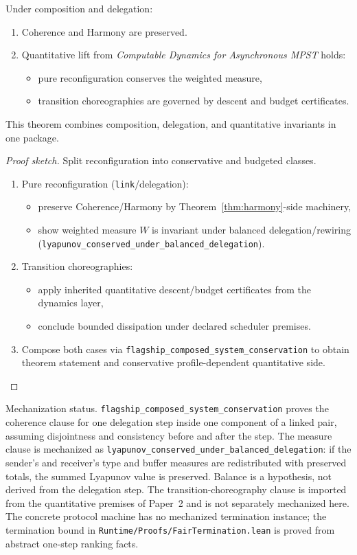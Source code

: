\documentclass[a4paper,10pt,twocolumn,english]{article}
\numberwithin{equation}{section}
\theoremstyle{paperdef}
\theoremstyle{paperplain}
\theoremstyle{paperdef}
\theoremstyle{paperremark}
\theoremstyle{paperdef}
\begin{document}
Under composition and delegation:
\begin{enumerate}
	\item Coherence and Harmony are preserved.
	\item Quantitative lift from \emph{Computable Dynamics for Asynchronous MPST} holds:
	      \begin{itemize}
		      \item pure reconfiguration conserves the weighted measure,
		      \item transition choreographies are governed by descent and budget certificates.
	      \end{itemize}
\end{enumerate}

This theorem combines composition, delegation, and quantitative invariants in one package.

\begin{proof}[Proof sketch]
	Split reconfiguration into conservative and budgeted classes.

	\begin{enumerate}
		\item Pure reconfiguration (\texttt{link}/delegation):
		      \begin{itemize}
			      \item preserve Coherence/Harmony by Theorem~\ref{thm:harmony}-side machinery,
			      \item show weighted measure $W$ is invariant under balanced delegation/rewiring (\nolinkurl{lyapunov_conserved_under_balanced_delegation}).
		      \end{itemize}
		\item Transition choreographies:
		      \begin{itemize}
			      \item apply inherited quantitative descent/budget certificates from the dynamics layer,
			      \item conclude bounded dissipation under declared scheduler premises.
		      \end{itemize}
		\item Compose both cases via \nolinkurl{flagship_composed_system_conservation} to obtain theorem statement and conservative profile-dependent quantitative side.
	\end{enumerate}
\end{proof}

Mechanization status. \nolinkurl{flagship_composed_system_conservation} proves the
coherence clause for one delegation step inside one component of a linked pair,
assuming disjointness and consistency before and after the step. The
measure clause is mechanized as
\nolinkurl{lyapunov_conserved_under_balanced_delegation}: if the sender's and
receiver's type and buffer measures are redistributed with preserved totals, the
summed Lyapunov value is preserved. Balance is a hypothesis, not derived from
the delegation step. The transition-choreography clause is imported from the
quantitative premises of Paper~2 and is not separately mechanized here. The
concrete protocol machine has no mechanized termination instance; the
termination bound in \texttt{Runtime/\allowbreak Proofs/\allowbreak FairTermination.lean} is
proved from abstract one-step ranking facts.
\end{document}
